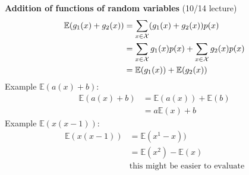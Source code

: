 \textbf{Addition of functions of random variables} 
{ \tiny (10/14 lecture)}
	\begin{align*}
		\mathbb{E} (g_1(x) + g_2(x)) &=   \sum\limits_{x \in {\cal X}} (g_1(x) + g_2(x))p(x) \\
			&= \sum\limits_{x \in {\cal X}} g_1(x)p(x) + \sum\limits_{x \in {\cal X}} g_2(x)p(x) \\
			&=\mathbb{E}  (g_1(x)) + \mathbb{E} (g_2(x)) \\
	\end{align*} 
Example $\mathbb{E}  (a(x) + b)$:
	\begin{align*}
		\mathbb{E} (a(x) + b) &=  \mathbb{E}  (a(x)) + \mathbb{E} (b) \\
			& = a\mathbb{E} (x) + b
	\end{align*} 
Example $\mathbb{E}  (x(x-1))$:
	\begin{align*}
		\mathbb{E} (x(x-1)) &= \mathbb{E} (x^1 - x)) \\
			& =  \mathbb{E}  (x^2) - \mathbb{E} (x)    \\
			& \mbox{this might be easier to evaluate}
	\end{align*} 


